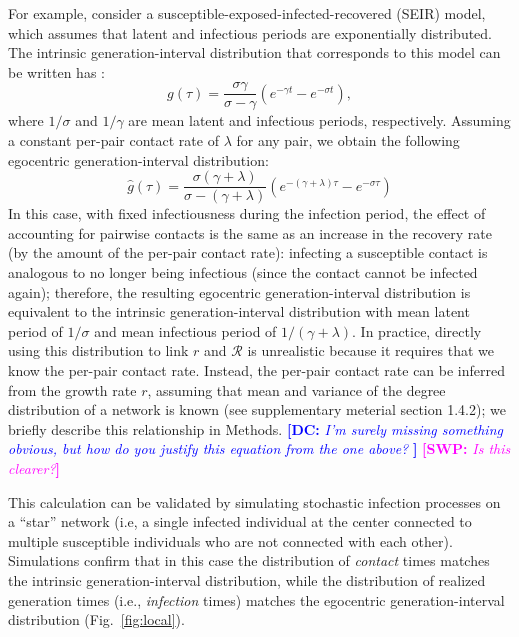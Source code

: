 \documentclass[12pt]{article}
\newcommand{\fref}[1]{Fig.~\ref{fig:#1}}
\newcommand{\RR}{\ensuremath{{\mathcal R}}}
\newcommand{\comment}[3]{\textcolor{#1}{\textbf{[#2: }\textsl{#3}\textbf{]}}}
\newcommand{\swp}[1]{\comment{magenta}{SWP}{#1}}
\newcommand{\dc}[1]{\comment{blue}{DC}{#1}}
\begin{document}
For example, consider a susceptible-exposed-infected-recovered (SEIR) model, which assumes that latent and infectious periods are exponentially distributed.
The intrinsic generation-interval distribution that corresponds to this model can be written has \citep{svensson2015influence}:
\begin{equation}
g(\tau) = \frac{\sigma \gamma}{\sigma - \gamma} \left(e^{-\gamma t} - e^{-\sigma t}\right),
\end{equation}
where $1/\sigma$ and $1/\gamma$ are mean latent and infectious periods, respectively.
Assuming a constant per-pair contact rate of $\lambda$ for any pair, we obtain the following egocentric generation-interval distribution:
\begin{equation}
\hat{g}(\tau) = \frac{\sigma (\gamma + \lambda)}{\sigma - (\gamma + \lambda)} \left(e^{-(\gamma + \lambda)\tau} - e^{-\sigma \tau}\right)
\end{equation}
In this case, with fixed infectiousness during the infection period, the effect of accounting for pairwise contacts is the same as an increase in the recovery rate (by the amount of the per-pair contact rate): infecting a susceptible contact is analogous to no longer being infectious (since the contact cannot be infected again); therefore, the resulting egocentric generation-interval distribution is equivalent to the intrinsic generation-interval distribution with mean latent period of $1/\sigma$ and mean infectious period of $1/(\gamma + \lambda)$.
In practice, directly using this distribution to link $r$ and $\RR$ is unrealistic because it requires that we know the per-pair contact rate. 
Instead, the per-pair contact rate can be inferred from the growth rate $r$, assuming that mean and variance of the degree distribution of a network is known (see \cite{trapman2016inferring} supplementary meterial section 1.4.2);
we briefly describe this relationship in Methods.
\dc{I'm surely missing something obvious, but how do you justify this equation from the one above? }
\swp{Is this clearer?}

This calculation can be validated by simulating stochastic infection processes on a ``star'' network (i.e, a single infected individual at the center connected to multiple susceptible individuals who are not connected with each other).
Simulations confirm that in this case the distribution of \emph{contact} times matches the intrinsic generation-interval distribution, while the distribution of realized generation times (i.e., \emph{infection} times) matches the egocentric generation-interval distribution (\fref{local}).
\end{document}
